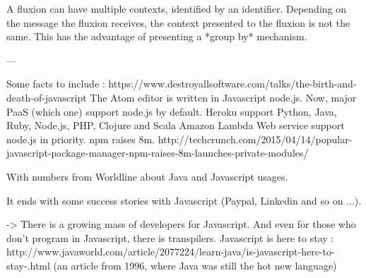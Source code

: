 A fluxion can have multiple contexts, identified by an identifier.
Depending on the message the fluxion receives, the context presented to the fluxion is not the same.
This has the advantage of presenting a *group by* mechanism.







---

Some facts to include :
https://www.destroyallsoftware.com/talks/the-birth-and-death-of-javascript
The Atom editor is written in Javascript node.js.
Now, major PaaS (which one) support node.js by default.
Heroku support Python, Java, Ruby, Node.js, PHP, Clojure and Scala
Amazon Lambda Web service support node.js in priority.
npm raises 8m.
http://techcrunch.com/2015/04/14/popular-javascript-package-manager-npm-raises-8m-launches-private-modules/


With numbers from Worldline about Java and Javascript usages.

It ends with some success stories with Javascript (Paypal, Linkedin and so on ...).

-> There is a growing mass of developers for Javascript.
And even for those who don't program in Javascript, there is transpilers.
Javascript is here to stay : http://www.javaworld.com/article/2077224/learn-java/is-javascript-here-to-stay-.html (an article from 1996, where Java was still the hot new language)
